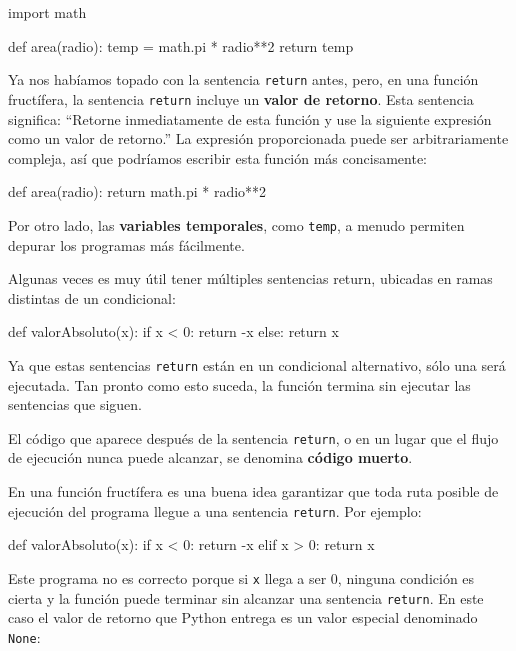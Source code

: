 \beforeverb
\begin{pythoncode}
import math

def area(radio):
  temp = math.pi * radio**2
  return temp
\end{pythoncode}
\afterverb
%

Ya nos habíamos topado con la sentencia \texttt{return} antes, pero, en una
función fructífera, la sentencia \texttt{return} incluye un {\bf valor de 
retorno}.  
Esta sentencia significa: ``Retorne inmediatamente de esta función
y use la siguiente expresión como un valor de retorno.''
La expresión proporcionada puede ser arbitrariamente compleja, así que 
podríamos escribir esta función más concisamente:

\beforeverb
\begin{pythoncode}
def area(radio):
  return math.pi * radio**2
\end{pythoncode}
\afterverb
%

Por otro lado, las {\bf  variables temporales}, como \texttt{temp}, a  menudo
permiten depurar los programas más fácilmente.


Algunas veces es muy útil tener múltiples sentencias return, ubicadas
en ramas distintas de un condicional:

\beforeverb
\begin{pythoncode}
def valorAbsoluto(x):
  if x < 0:
    return -x
  else:
    return x
\end{pythoncode}
\afterverb
%

Ya que estas sentencias \texttt{return} están en un condicional alternativo,
sólo una será ejecutada. Tan pronto como esto suceda, la función termina
sin ejecutar las sentencias que siguen.

El código que aparece después de la sentencia \texttt{return}, o en un lugar
que el flujo de ejecución nunca puede alcanzar, se denomina {\bf código muerto}.


En una función fructífera es una buena idea garantizar que toda ruta posible
de ejecución del programa llegue a una sentencia \texttt{return}.  Por ejemplo:

\beforeverb
\begin{pythoncode}
def valorAbsoluto(x):
  if x < 0:
    return -x
  elif x > 0:
    return x
\end{pythoncode}
\afterverb
%

Este programa no es correcto porque si \texttt{x} llega a ser 0,
ninguna condición es cierta y la función puede terminar sin alcanzar
una sentencia \texttt{return}. En este caso el valor de retorno que 
Python entrega es un valor especial denominado \texttt{None}:

